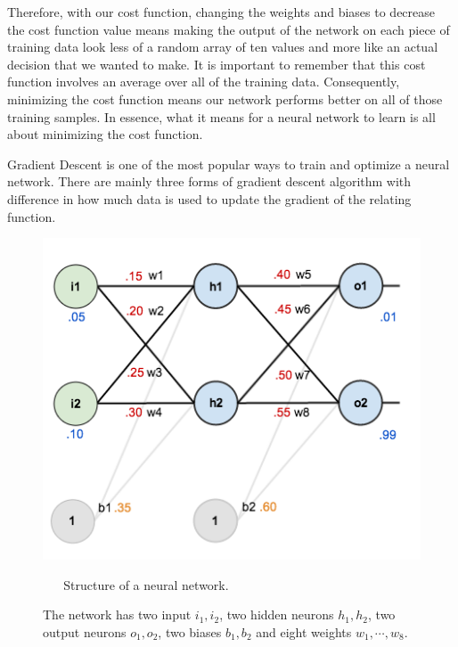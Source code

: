 \documentclass[master]{thesis-uestc}
\begin{document}
Therefore, with our cost function, changing the weights and biases to decrease the cost function value means making the output of the network on each piece of training data look less of a random array of ten values and more like an actual decision that we wanted to make. It is important to remember that this cost function involves an average over all of the training data. Consequently, minimizing the cost function means our network performs better on all of those training samples. In essence, what it means for a neural network to learn is all about minimizing the cost function.

Gradient Descent is one of the most popular ways to train and optimize a neural network. There are mainly three forms of gradient descent algorithm with difference in how much data is used to update the gradient of the relating function.

\begin{figure}[ht]
\includegraphics[width=5in]{pic/network_example2.png}
\caption{\,\,\,\,\,\,\,\,\,\,Structure of a neural network.}
\caption*{The network has two input $i_1, i_2$,  two hidden neurons $h_1, h_2$, two output neurons $o_1, o_2$, two biases $b_1, b_2$ and eight weights $w_1, \cdots, w_8$.}
\label{neural_net_example}
\end{figure}
\end{document}

